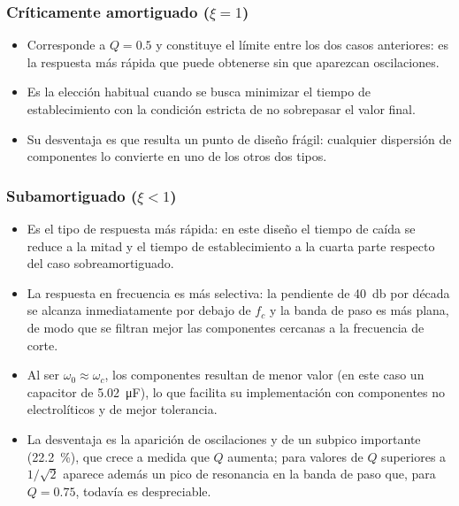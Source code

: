 \subsubsection{Críticamente amortiguado ($\xi = 1$)}

\begin{itemize}
  \item Corresponde a $Q = \num{0.5}$ y constituye el límite entre los dos casos anteriores: es la respuesta
        más rápida que puede obtenerse sin que aparezcan oscilaciones.
  \item Es la elección habitual cuando se busca minimizar el tiempo de establecimiento con la condición
        estricta de no sobrepasar el valor final.
  \item Su desventaja es que resulta un punto de diseño frágil: cualquier dispersión de componentes lo
        convierte en uno de los otros dos tipos.
\end{itemize}

\subsubsection{Subamortiguado ($\xi < 1$)}

\begin{itemize}
  \item Es el tipo de respuesta más rápida: en este diseño el tiempo de caída se reduce a la mitad y el
        tiempo de establecimiento a la cuarta parte respecto del caso sobreamortiguado.
  \item La respuesta en frecuencia es más selectiva: la pendiente de \qty{40}{\decibel} por década se
        alcanza inmediatamente por debajo de $f_c$ y la banda de paso es más plana, de modo que se filtran
        mejor las componentes cercanas a la frecuencia de corte.
  \item Al ser $\omega_0 \approx \omega_c$, los componentes resultan de menor valor (en este caso un
        capacitor de \qty{5.02}{\micro\farad}), lo que facilita su implementación con componentes no
        electrolíticos y de mejor tolerancia.
  \item La desventaja es la aparición de oscilaciones y de un subpico importante (\qty{22.2}{\percent}), que
        crece a medida que $Q$ aumenta; para valores de $Q$ superiores a $1/\sqrt{2}$ aparece además un pico
        de resonancia en la banda de paso que, para $Q = \num{0.75}$, todavía es despreciable.
\end{itemize}

